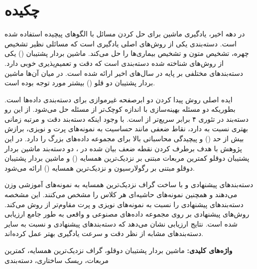 
\thispagestyle{plain}


\section*{چکیده}
 در دهه اخیر، یادگیری ماشین برای حل کردن مسائل با الگوهای پیچیده استفاده شده است. دسته‌بندی یکی از روش‌های اصلی یادگیری است که مسائلی نظیر تشخیص چهره، تشخیص متون و تشخیص بیماری‌ها را حل می‌کند. ماشین بردار پشتیبان  () یکی از روش‌های شناخته شده  دسته‌بندی است که دقت و تعمیم‌پذیری خوبی دارد. دسته‌بندهای مختلفی بر پایه  در سال‌های اخیر ارائه شده است. در میان آن‌ها ماشین بردار پشتیبان دو قلو () بیشتر مورد توجه بوده است.

ایده اصلی روش  پیدا کردن دو ابرصفحه غیرموازی برای دسته‌بندی داده‌ها است. بطوریکه دو مسئله بهینه‌سازی با اندازه کوچک‌تر از مسئله  حل می‌شود. از این رو دسته‌بند  در تئوری ۴ برابر سریع‌تر از  است. با وجود اینکه دسته‌بند  دقت و مرتبه زمانی بهتری نسبت به  دارد، نقاط ضعفی مانند حساسیت به نمونه‌های پرت و نویزی، برازش بیش از حد () و پیچیدگی محاسباتی بالا برای مجموعه داده‌های بزرگ را دارد.  در این پژوهش با هدف برطرف کردن نقطه ضعف بیان شده در ، دو دسته‌بند ماشین بردار پشتیبان دوقلو کمترین مربعات مبتنی بر نزدیک‌ترین همسایه () و ماشین بردار پشتیبان دوقلو مبتنی بر رگولارسیون و نزدیک‌ترین همسایه () ارائه می‌شود.  

دسته‌بندهای پیشنهادی  و  با ساخت گراف نزدیک‌ترین همسایه به نمونه‌های آموزشی وزن می‌دهند و همچنین نمونه‌های حاشیه‌ای هر کلاس را مشخص می‌کنند. این مشخصه دسته‌بندهای پیشنهادی را نسبت به نمونه‌های نویزی و پرت مقاوم‌تر از روش   می‌کند. روش‌های پیشنهادی بر روی مجموعه داده‌های مصنوعی و واقعی به طور جامع ارزیابی شده است. نتایج ارزیابی نشان می‌دهد که دسته‌بندهای پیشنهادی  و  نسبت به سایر دسته‌بندهای مشابه از نظر دقت و سرعت یادگیری بهتر عمل کرده‌اند.


\vskip 2cm
\noindent
\textbf{واژه‌های کلیدی:} 
ماشین بردار پشتیبان دوقلو، گراف نزدیک‌ترین همسایه، کمترین مربعات، ریسک ساختاری، دسته‌بندی
